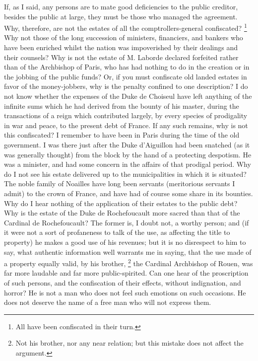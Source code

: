 If, as I said, any persons are to mate good deficiencies to the public creditor, besides the public at large, they must be those who managed the agreement. Why, therefore, are not the estates of all the comptrollers-general confiscated?
\footnote{ All have been confiscated in their turn.}
 Why not those of the long succession of ministers, financiers, and bankers who have been enriched whilst the nation was impoverished by their dealings and their counsels? Why is not the estate of M. Laborde declared forfeited rather than of the Archbishop of Paris, who has had nothing to do in the creation or in the jobbing of the public funds? Or, if you must confiscate old landed estates in favor of the money-jobbers, why is the penalty confined to one description? I do not know whether the expenses of the Duke de Choiseul have left anything of the infinite sums which he had derived from the bounty of his master, during the transactions of a reign which contributed largely, by every species of prodigality in war and peace, to the present debt of France. If any such remains, why is not this confiscated? I remember to have been in Paris during the time of the old government. I was there just after the Duke d'Aiguillon had been snatched (as it was generally thought) from the block by the hand of a protecting despotism. He was a minister, and had some concern in the affairs of that prodigal period. Why do I not see his estate delivered up to the municipalities in which it is situated? The noble family of Noailles have long been servants (meritorious servants I admit) to the crown of France, and have had of course some share in its bounties. Why do I hear nothing of the application of their estates to the public debt? Why is the estate of the Duke de Rochefoucault more sacred than that of the Cardinal de Rochefoucault? The former is, I doubt not, a worthy person; and (if it were not a sort of profaneness to talk of the use, as affecting the title to property) he makes a good use of his revenues; but it is no disrespect to him to say, what authentic information well warrants me in saying, that the use made of a property equally valid, by his brother,
\footnote{ Not his brother, nor any near relation; but this mistake does not affect the argument.}
 the Cardinal Archbishop of Rouen, was far more laudable and far more public-spirited. Can one hear of the proscription of such persons, and the confiscation of their effects, without indignation, and horror? He is not a man who does not feel such emotions on such occasions. He does not deserve the name of a free man who will not express them.

